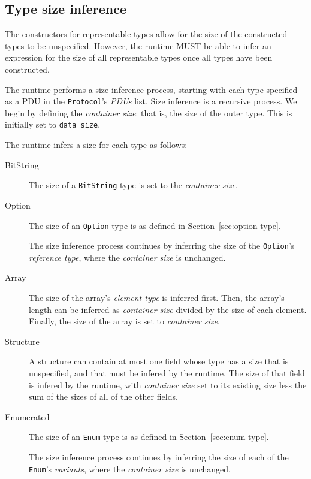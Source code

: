 \documentclass[10pt,twocolumn,a4paper]{article}
\newcommand{\code}[1]{\texttt{#1}}
\begin{document}
\subsection{Type size inference}
\label{sec:runtime-size-inference}

The constructors for representable types allow for the size of the constructed
types to be unspecified. However, the runtime MUST be able to infer an
expression for the size of all representable types once all types have been
constructed.

The runtime performs a size inference process, starting with each type specified
as a PDU in the \code{Protocol}'s \emph{PDUs} list. Size inference is a
recursive process. We begin by defining the \emph{container size}: that is, the
size of the outer type. This is initially set to \code{data\_size}.

The runtime infers a size for each type as follows:
\begin{description}
  \item[BitString]
    The size of a \code{BitString} type is set to the \emph{container size}.
  \item[Option]
    The size of an \code{Option} type is as defined in
    Section~\ref{sec:option-type}.

    The size inference process continues by inferring the size of the
    \code{Option}'s \emph{reference type}, where the \emph{container size} is
    unchanged.
  \item[Array]
    The size of the array's \emph{element type} is inferred first. Then, the
    array's length can be inferred as \emph{container size} divided by the size
    of each element. Finally, the size of the array is set to
    \emph{container size}.
  \item[Structure]
    A structure can contain at most one field whose type has a size that is
    unspecified, and that must be infered by the runtime. The size of that
    field is infered by the runtime, with \emph{container size} set to its
    existing size less the sum of the sizes of all of the other fields.
  \item[Enumerated]
    The size of an \code{Enum} type is as defined in
    Section~\ref{sec:enum-type}.

    The size inference process continues by inferring the size of each of the
    \code{Enum}'s \emph{variants}, where the \emph{container size} is unchanged.
\end{description}

\end{document}
